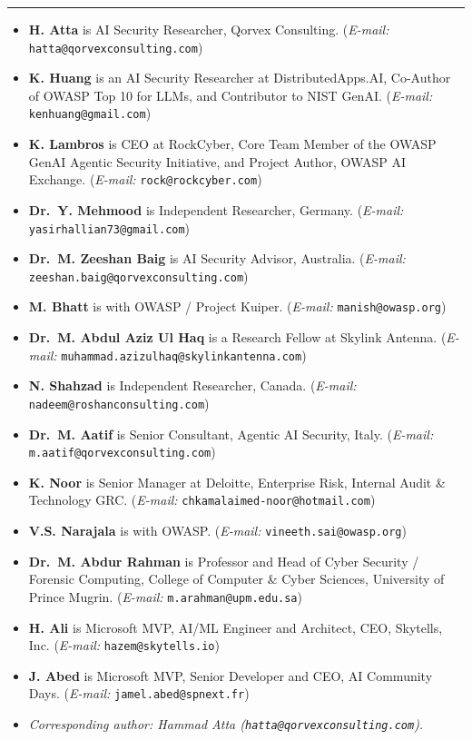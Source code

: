 \documentclass[10pt,twocolumn]{article}
\begin{document}
\vspace{3pt}\rule{\columnwidth}{0.4pt}\vspace{3pt}

\begin{itemize}[leftmargin=*,topsep=2pt,itemsep=2pt,parsep=0pt,label={\tiny$\bullet$}]
\small
  \item \textbf{H. Atta} is AI Security Researcher, Qorvex Consulting.
        (\textit{E-mail:} \texttt{hatta@qorvexconsulting.com})
  \item \textbf{K. Huang} is an AI Security Researcher at DistributedApps.AI,
        Co-Author of OWASP Top 10 for LLMs, and Contributor to NIST GenAI.
        (\textit{E-mail:} \texttt{kenhuang@gmail.com})
  \item \textbf{K. Lambros} is CEO at RockCyber, Core Team Member of the OWASP
        GenAI Agentic Security Initiative, and Project Author, OWASP AI Exchange.
        (\textit{E-mail:} \texttt{rock@rockcyber.com})
  \item \textbf{Dr.\ Y. Mehmood} is Independent Researcher, Germany.
        (\textit{E-mail:} \texttt{yasirhallian73@gmail.com})
  \item \textbf{Dr.\ M. Zeeshan Baig} is AI Security Advisor, Australia.
        (\textit{E-mail:} \texttt{zeeshan.baig@qorvexconsulting.com})
  \item \textbf{M. Bhatt} is with OWASP / Project Kuiper.
        (\textit{E-mail:} \texttt{manish@owasp.org})
  \item \textbf{Dr.\ M. Abdul Aziz Ul Haq} is a Research Fellow at Skylink Antenna.
        (\textit{E-mail:} \texttt{muhammad.azizulhaq@skylinkantenna.com})
  \item \textbf{N. Shahzad} is Independent Researcher, Canada.
        (\textit{E-mail:} \texttt{nadeem@roshanconsulting.com})
  \item \textbf{Dr.\ M. Aatif} is Senior Consultant, Agentic AI Security, Italy.
        (\textit{E-mail:} \texttt{m.aatif@qorvexconsulting.com})
  \item \textbf{K. Noor} is Senior Manager at Deloitte, Enterprise Risk,
        Internal Audit \& Technology GRC.
        (\textit{E-mail:} \texttt{chkamalaimed-noor@hotmail.com})
  \item \textbf{V.S. Narajala} is with OWASP.
        (\textit{E-mail:} \texttt{vineeth.sai@owasp.org})
  \item \textbf{Dr.\ M. Abdur Rahman} is Professor and Head of Cyber Security /
        Forensic Computing, College of Computer \& Cyber Sciences,
        University of Prince Mugrin.
        (\textit{E-mail:} \texttt{m.arahman@upm.edu.sa})
  \item \textbf{H. Ali} is Microsoft MVP, AI/ML Engineer and Architect, CEO, Skytells, Inc.
        (\textit{E-mail:} \texttt{hazem@skytells.io})
  \item \textbf{J. Abed} is Microsoft MVP, Senior Developer and CEO, AI Community Days.
        (\textit{E-mail:} \texttt{jamel.abed@spnext.fr})
  \item \textit{Corresponding author: Hammad Atta (\texttt{hatta@qorvexconsulting.com}).}
\end{itemize}
\end{document}
